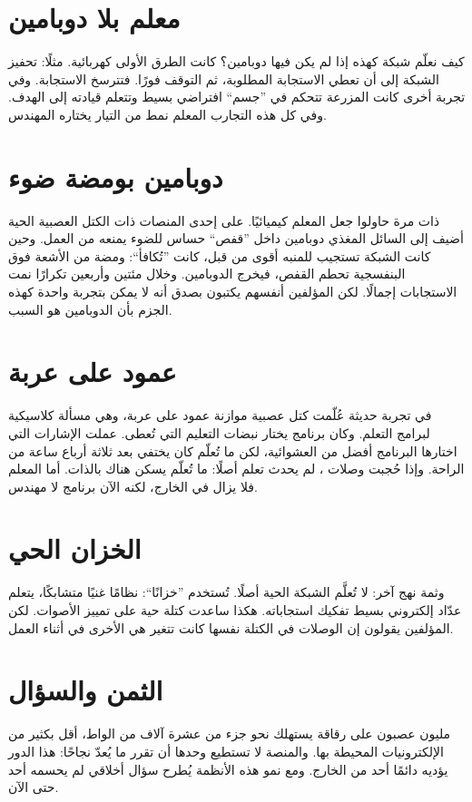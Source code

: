 \section*{معلم بلا دوبامين}

كيف نعلّم شبكة كهذه إذا لم يكن فيها دوبامين؟ كانت الطرق الأولى كهربائية. مثلًا: تحفيز الشبكة إلى أن تعطي الاستجابة المطلوبة، ثم التوقف فورًا. فتترسخ الاستجابة. وفي تجربة أخرى كانت المزرعة تتحكم في ”جسم“ افتراضي بسيط وتتعلم قيادته إلى الهدف. وفي كل هذه التجارب المعلم نمط من التيار يختاره المهندس.

\section*{دوبامين بومضة ضوء}

ذات مرة حاولوا جعل المعلم كيميائيًا. على إحدى المنصات ذات الكتل العصبية الحية أضيف إلى السائل المغذي دوبامين داخل ”قفص“ حساس للضوء يمنعه من العمل. وحين كانت الشبكة تستجيب للمنبه أقوى من قبل، كانت ”تُكافأ“: ومضة من الأشعة فوق البنفسجية تحطم القفص، فيخرج الدوبامين. وخلال مئتين وأربعين تكرارًا نمت الاستجابات إجمالًا. لكن المؤلفين أنفسهم يكتبون بصدق أنه لا يمكن بتجربة واحدة كهذه الجزم بأن الدوبامين هو السبب.

\section*{عمود على عربة}

في تجربة حديثة عُلّمت كتل عصبية موازنة عمود على عربة، وهي مسألة كلاسيكية لبرامج التعلم. وكان برنامج يختار نبضات التعليم التي تُعطى. عملت الإشارات التي اختارها البرنامج أفضل من العشوائية، لكن ما تُعلّم كان يختفي بعد ثلاثة أرباع ساعة من الراحة. وإذا حُجبت وصلات ، لم يحدث تعلم أصلًا: ما تُعلّم يسكن هناك بالذات. أما المعلم فلا يزال في الخارج، لكنه الآن برنامج لا مهندس.

\section*{الخزان الحي}

وثمة نهج آخر: لا تُعلَّم الشبكة الحية أصلًا. تُستخدم ”خزانًا“: نظامًا غنيًا متشابكًا، يتعلم عدّاد إلكتروني بسيط تفكيك استجاباته. هكذا ساعدت كتلة حية على تمييز الأصوات. لكن المؤلفين يقولون إن الوصلات في الكتلة نفسها كانت تتغير هي الأخرى في أثناء العمل.

\section*{الثمن والسؤال}

مليون عصبون على رقاقة يستهلك نحو جزء من عشرة آلاف من الواط، أقل بكثير من الإلكترونيات المحيطة بها. والمنصة لا تستطيع وحدها أن تقرر ما يُعدّ نجاحًا: هذا الدور يؤديه دائمًا أحد من الخارج. ومع نمو هذه الأنظمة يُطرح سؤال أخلاقي لم يحسمه أحد حتى الآن.

